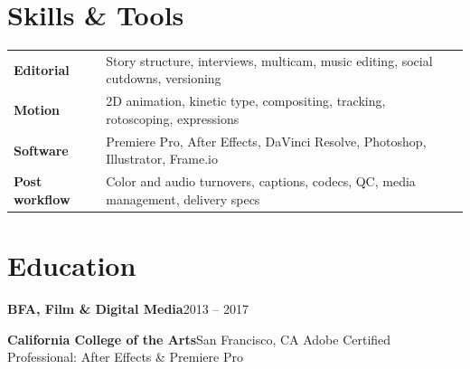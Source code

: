 \documentclass[10pt,letterpaper]{article}
\newcommand{\skillrow}[2]{%
  \textbf{\color{ink}#1} & {\small\color{slate}#2}\\[2.4pt]
}
\begin{document}
\section{Skills \& Tools}

\begin{tabularx}{\linewidth}{@{}>{\raggedright\arraybackslash}p{1.18in}X@{}}
  \skillrow{Editorial}{Story structure, interviews, multicam, music editing, social cutdowns, versioning}
  \skillrow{Motion}{2D animation, kinetic type, compositing, tracking, rotoscoping, expressions}
  \skillrow{Software}{Premiere Pro, After Effects, DaVinci Resolve, Photoshop, Illustrator, Frame.io}
  \skillrow{Post workflow}{Color and audio turnovers, captions, codecs, QC, media management, delivery specs}
\end{tabularx}

\section{Education}

\textbf{BFA, Film \& Digital Media}\hfill{\small\color{slate}2013 -- 2017}\par
{\color{accent}\textbf{California College of the Arts}}{\color{slate}\enspace\textbar\enspace San Francisco, CA}
\hfill{\small\color{slate}Adobe Certified Professional: After Effects \& Premiere Pro}
\end{document}
